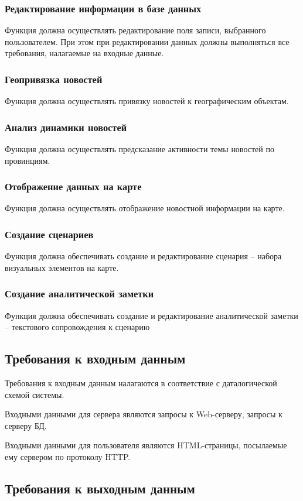 \documentclass[russian,utf8,emptystyle]{eskdtext}
\begin{document}
\subsubsection{Редактирование информации в базе данных}
Функция должна осуществлять редактирование поля записи, выбранного пользователем. При этом при редактировании данных должны выполняться все требования, налагаемые на входные данные.
\subsubsection{Геопривязка новостей}
Функция должна осуществлять привязку новостей к географическим объектам.
\subsubsection{Анализ динамики новостей}
Функция должна осуществлять предсказание активности темы новостей по провинциям.
\subsubsection{Отображение данных на карте}
Функция должна осуществлять отображение новостной информации на карте.
\subsubsection{Создание сценариев}
Функция должна обеспечивать создание и редактирование сценария – набора визуальных элементов на карте.
\subsubsection{Создание аналитической заметки}
Функция должна обеспечивать создание и редактирование аналитической заметки – текстового сопровождения к сценарию

\subsection{Требования к входным данным}

Требования к входным данным налагаются в соответствие с даталогической схемой системы. 

Входными данными для сервера являются запросы к Web-серверу, запросы к серверу БД.

Входными данными для пользователя являются HTML-страницы, посылаемые ему сервером по протоколу HTTP.

\subsection{Требования к выходным данным}
\end{document}
